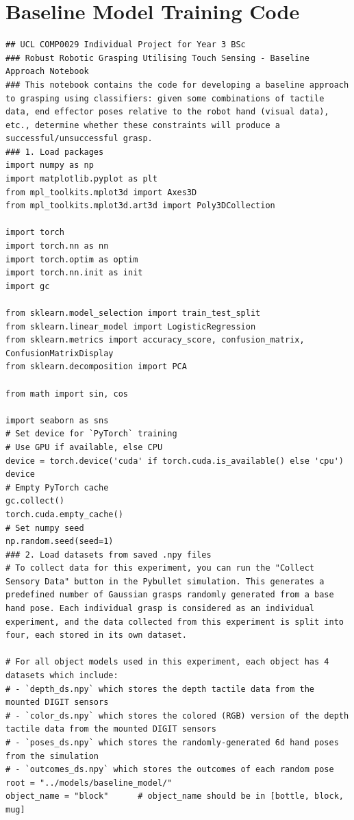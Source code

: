 \documentclass[11pt, a4paper]{report}
\begin{document}
\section{Baseline Model Training Code}
\begin{lstlisting}
## UCL COMP0029 Individual Project for Year 3 BSc
### Robust Robotic Grasping Utilising Touch Sensing - Baseline Approach Notebook
### This notebook contains the code for developing a baseline approach to grasping using classifiers: given some combinations of tactile data, end effector poses relative to the robot hand (visual data), etc., determine whether these constraints will produce a successful/unsuccessful grasp.
### 1. Load packages
import numpy as np
import matplotlib.pyplot as plt
from mpl_toolkits.mplot3d import Axes3D
from mpl_toolkits.mplot3d.art3d import Poly3DCollection

import torch
import torch.nn as nn
import torch.optim as optim
import torch.nn.init as init
import gc

from sklearn.model_selection import train_test_split
from sklearn.linear_model import LogisticRegression
from sklearn.metrics import accuracy_score, confusion_matrix, ConfusionMatrixDisplay
from sklearn.decomposition import PCA

from math import sin, cos

import seaborn as sns
# Set device for `PyTorch` training
# Use GPU if available, else CPU
device = torch.device('cuda' if torch.cuda.is_available() else 'cpu')
device
# Empty PyTorch cache
gc.collect()
torch.cuda.empty_cache()
# Set numpy seed
np.random.seed(seed=1)
### 2. Load datasets from saved .npy files
# To collect data for this experiment, you can run the "Collect Sensory Data" button in the Pybullet simulation. This generates a predefined number of Gaussian grasps randomly generated from a base hand pose. Each individual grasp is considered as an individual experiment, and the data collected from this experiment is split into four, each stored in its own dataset.

# For all object models used in this experiment, each object has 4 datasets which include:
# - `depth_ds.npy` which stores the depth tactile data from the mounted DIGIT sensors
# - `color_ds.npy` which stores the colored (RGB) version of the depth tactile data from the mounted DIGIT sensors
# - `poses_ds.npy` which stores the randomly-generated 6d hand poses from the simulation
# - `outcomes_ds.npy` which stores the outcomes of each random pose
root = "../models/baseline_model/"
object_name = "block"      # object_name should be in [bottle, block, mug]


\end{lstlisting}
\end{document}
